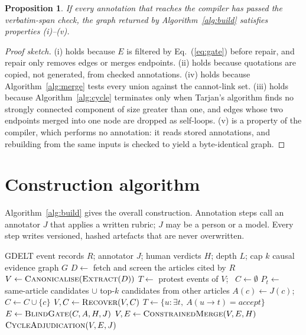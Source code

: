 \documentclass[pdflatex,sn-basic,lineno]{sn-jnl}
\theoremstyle{thmstylethree}
\theoremstyle{thmstyleone}
\newtheorem{proposition}{Proposition}
\begin{document}
\begin{proposition}\label{prop:invariants}
If every annotation that reaches the compiler has passed the verbatim-span check, the graph
returned by Algorithm~\ref{alg:build} satisfies properties (i)--(v).
\end{proposition}
\begin{proof}[Proof sketch]
(i) holds because $E$ is filtered by Eq.~(\ref{eq:gate}) before repair, and repair only removes
edges or merges endpoints. (ii) holds because quotations are copied, not generated, from checked
annotations. (iv) holds because Algorithm~\ref{alg:merge} tests every union against the
cannot-link set. (iii) holds because Algorithm~\ref{alg:cycle} terminates only when Tarjan's
algorithm finds no strongly connected component of size greater than one, and edges whose two
endpoints merged into one node are dropped as self-loops. (v) is a property of the compiler, which
performs no annotation: it reads stored annotations, and rebuilding from the same inputs is checked
to yield a byte-identical graph.
\end{proof}

\section{Construction algorithm}\label{sec:method}

Algorithm~\ref{alg:build} gives the overall construction. Annotation steps call an annotator $J$
that applies a written rubric; $J$ may be a person or a model. Every step writes versioned,
hashed artefacts that are never overwritten.

\begin{algorithm}[!htbp]
\caption{Build: from GDELT records to a causal evidence graph}
\label{alg:build}
\small
\begin{algorithmic}[1]
\Require GDELT event records $R$; annotator $J$; human verdicts $H$; depth $L$; cap $k$
\Ensure causal evidence graph $G$
\State $D \gets$ fetch and screen the articles cited by $R$
\State $V \gets \textsc{Canonicalise}(\textsc{Extract}(D))$ 
\State $T \gets$ protest events of $V$; \ $C \gets \emptyset$
    \State $P_t \gets$ same-article candidates $\cup$ top-$k$ candidates from other articles
      \State $A(c) \gets J(c)$; \ $C \gets C\cup\{c\}$ 
    \EndFor
  \EndFor
  \State $V, C \gets \textsc{Recover}(V, C)$ 
  \State $T \gets \{u : \exists t,\ A(u\rightarrow t)=\textit{accept}\}$ 
\EndFor
\State $E \gets \textsc{BlindGate}(C, A, H, J)$ 
\State $V, E \gets \textsc{ConstrainedMerge}(V, E, H)$ 
\State \Return $\textsc{CycleAdjudication}(V, E, J)$ 
\end{algorithmic}
\end{algorithm}
\end{document}
